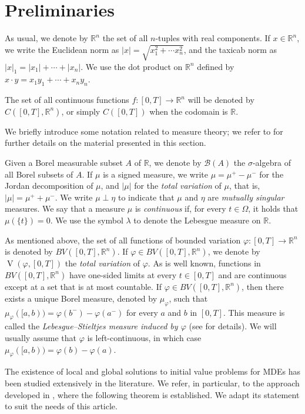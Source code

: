 \documentclass[a4paper,11pt]{amsart}
\theoremstyle{plain}
\theoremstyle{remark}
\newcommand{\rr}{\mathbb{R}}
\newcommand{\V}{\operatorname{V}}
\numberwithin{equation}{section}
\begin{document}
\section{Preliminaries}\label{sec:preli}



As usual, we denote by $\rr^n$ the set of all $n$-tuples with real components.  
If $x\in \rr^n$, we write the Euclidean norm as $|x|=\sqrt{x_1^2+\cdots x_n^2}$, and the taxicab norm as $|x|_1=|x_1|+\cdots +|x_n|$. 
We use the dot product on $\rr^n$ defined by $x\cdot y=x_1y_1 + \cdots + x_ny_n$.

The set of all continuous functions $f:[0,T]\to \rr^n$ will be denoted by $C([0,T],\rr^n)$, or simply $C([0,T])$ when the codomain is $\rr$.    

We briefly introduce some notation related to measure theory; we refer to \cite{StanislawSaks,EdwinHewitt,folland, Evans, Carter} for further details on the material presented in this section.
 
Given a Borel measurable subset $A$ of $\rr$, we denote by $\mathscr{B}(A)$ the $\sigma$-algebra of all Borel subsets of $A$. If $\mu$ is a signed measure, we write $\mu=\mu^+ -\mu^-$ for the Jordan decomposition of $\mu$, and $|\mu|$ for the \emph{total variation} of $\mu$, that is, $|\mu|=\mu^+ +\mu^-$. We write $\mu\perp \eta$ to indicate that $\mu$ and $\eta$ are \emph{mutually singular} measures. We say that a measure $\mu$ is \emph{continuous} if, for every $t\in \Omega$, it holds that $\mu(\{t\})=0$. We use the symbol $\lambda$ to denote the Lebesgue measure on $\mathbb{R}$.
 

As mentioned above, the set of all functions of bounded variation $\varphi:[0,T]\to \rr^n$ is denoted by $BV([0,T],\rr^n)$. If $\varphi\in BV([0,T],\rr^n)$, we denote by $\V(\varphi,[0,T])$ the \emph{total variation} of $\varphi$. As is well known, functions in $BV([0,T],\rr^n)$ have one-sided limits at every $t\in [0,T]$ and are continuous except at a set that is at most countable. If $\varphi\in BV([0,T],\rr^n)$, then there exists a unique Borel measure, denoted by $\mu_{\varphi}$, such that $\mu_{\varphi}([a,b))=\varphi(b^-)-\varphi(a^-)$ for every $a$ and $b$ in $[0,T]$. This measure is called the \emph{Lebesgue--Stieltjes measure induced by $\varphi$} (see \cite{folland} for details). We will usually assume that $\varphi$ is left-continuous, in which case $\mu_{\varphi}([a,b))=\varphi(b)-\varphi(a)$.

 
The existence of local and global solutions to initial value problems for MDEs has been studied extensively in the literature. We refer, in particular, to the approach developed in \cite{P.Mazzone}, where the following theorem is established. We adapt its statement to suit the needs of this article.
\end{document}

